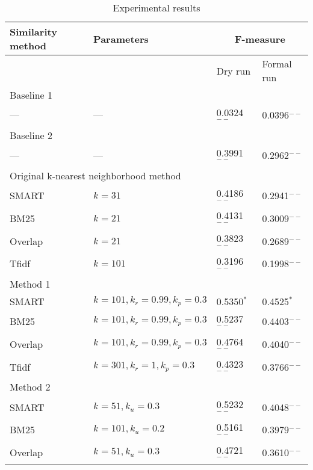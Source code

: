 \documentclass[english]{jnlp_1.2c}
\begin{document}
\begin{table}[t]
\caption{Experimental results}
\label{tab:result}
\begin{center}
\begin{tabular}{|l|l|l|l|} \hline
Similarity method    & Parameters             & \multicolumn{2}{|c|}{F-measure} \\\hline   
    &                             &  Dry run    & Formal run\\\hline 
\multicolumn{4}{|l|}{Baseline 1} \\\hline
---           & ---                         & 0.0324$^{--}$     & 0.0396$^{--}$\\\hline
\multicolumn{4}{|l|}{Baseline 2} \\\hline                       
---           & ---                         & 0.3991$^{--}$     & 0.2962$^{--}$\\\hline
\multicolumn{4}{|l|}{Original k-nearest neighborhood method} \\\hline               
SMART         & $k=31$                      & 0.4186$^{--}$     & 0.2941$^{--}$\\
BM25          & $k=21$                      & 0.4131$^{--}$     & 0.3009$^{--}$\\
Overlap       & $k=21$                      & 0.3823$^{--}$     & 0.2689$^{--}$\\
Tfidf         & $k=101$                     & 0.3196$^{--}$     & 0.1998$^{--}$\\
\hline
\multicolumn{4}{|l|}{Method 1} \\\hline                         
SMART         & $k=101,k_r=0.99,k_p=0.3$    & 0.5350$^{*}$      & 0.4525$^{*}$\\
BM25          & $k=101,k_r=0.99,k_p=0.3$    & 0.5237$^{--}$     & 0.4403$^{--}$\\
Overlap       & $k=101,k_r=0.99,k_p=0.3$    & 0.4764$^{--}$     & 0.4040$^{--}$\\
Tfidf         & $k=301,k_r=1,k_p=0.3$       & 0.4323$^{--}$     & 0.3766$^{--}$\\
\hline
\multicolumn{4}{|l|}{Method 2} \\\hline                         
SMART         & $k=51,k_u=0.3$              & 0.5232$^{--}$     & 0.4048$^{--}$\\
BM25          & $k=101,k_u=0.2$             & 0.5161$^{--}$     & 0.3979$^{--}$\\
Overlap       & $k=51,k_u=0.3$              & 0.4721$^{--}$     & 0.3610$^{--}$\\

\end{tabular}
\end{center}
\end{table}
\end{document}
